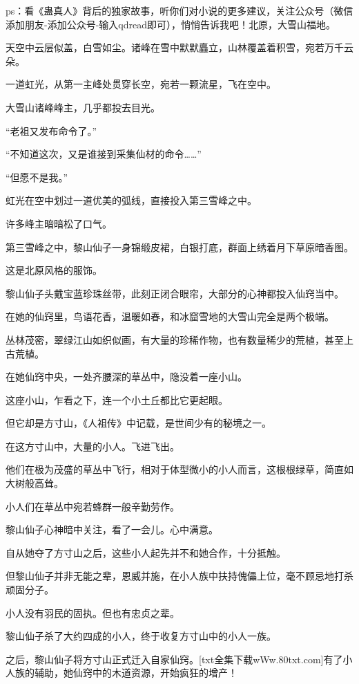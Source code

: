 
\begin{this_body}

ps：看《蛊真人》背后的独家故事，听你们对小说的更多建议，关注公众号（微信添加朋友-添加公众号-输入qdread即可），悄悄告诉我吧！北原，大雪山福地。

天空中云层似盖，白雪如尘。诸峰在雪中默默矗立，山林覆盖着积雪，宛若万千云朵。

一道虹光，从第一主峰处贯穿长空，宛若一颗流星，飞在空中。

大雪山诸峰峰主，几乎都投去目光。

“老祖又发布命令了。”

“不知道这次，又是谁接到采集仙材的命令……”

“但愿不是我。”

虹光在空中划过一道优美的弧线，直接投入第三雪峰之中。

许多峰主暗暗松了口气。

第三雪峰之中，黎山仙子一身锦缎皮裙，白银打底，群面上绣着月下草原暗香图。

这是北原风格的服饰。

黎山仙子头戴宝蓝珍珠丝带，此刻正闭合眼帘，大部分的心神都投入仙窍当中。

在她的仙窍里，鸟语花香，温暖如春，和冰窟雪地的大雪山完全是两个极端。

丛林茂密，翠绿江山如织似画，有大量的珍稀作物，也有数量稀少的荒植，甚至上古荒植。

在她仙窍中央，一处齐腰深的草丛中，隐没着一座小山。

这座小山，乍看之下，连一个小土丘都比它更起眼。

但它却是方寸山，《人祖传》中记载，是世间少有的秘境之一。

在这方寸山中，大量的小人。飞进飞出。

他们在极为茂盛的草丛中飞行，相对于体型微小的小人而言，这根根绿草，简直如大树般高耸。

小人们在草丛中宛若蜂群一般辛勤劳作。

黎山仙子心神暗中关注，看了一会儿。心中满意。

自从她夺了方寸山之后，这些小人起先并不和她合作，十分抵触。

但黎山仙子并非无能之辈，恩威并施，在小人族中扶持傀儡上位，毫不顾忌地打杀顽固分子。

小人没有羽民的固执。但也有忠贞之辈。

黎山仙子杀了大约四成的小人，终于收复方寸山中的小人一族。

之后，黎山仙子将方寸山正式迁入自家仙窍。[txt全集下载wWw.80txt.com]有了小人族的辅助，她仙窍中的木道资源，开始疯狂的增产！


\end{this_body}
